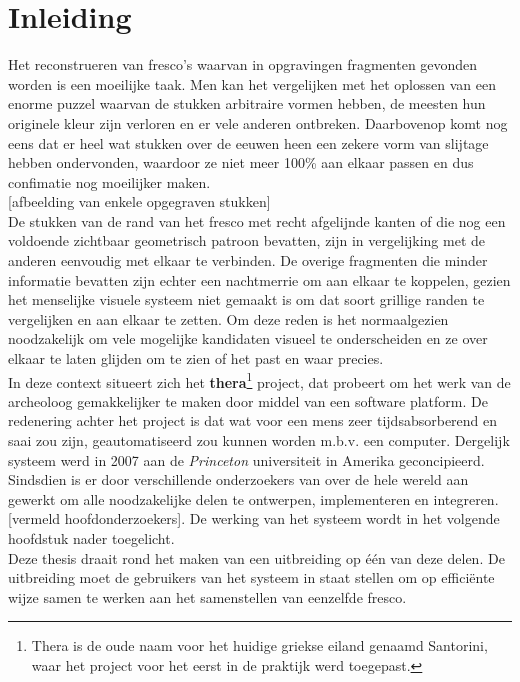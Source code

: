 \chapter{Inleiding}
\label{inleiding}
Het reconstrueren van fresco's waarvan in opgravingen fragmenten gevonden worden is een moeilijke taak. Men kan het vergelijken met het oplossen van een enorme puzzel
waarvan de stukken arbitraire vormen hebben, de meesten hun originele kleur zijn verloren en er vele anderen ontbreken. Daarbovenop komt nog eens dat er
heel wat stukken over de eeuwen heen een zekere vorm van slijtage hebben ondervonden, waardoor ze niet meer 100\% aan elkaar passen en dus confimatie nog moeilijker maken.\\

[afbeelding van enkele opgegraven stukken]\\

De stukken van de rand van het fresco met recht afgelijnde kanten of die nog een voldoende zichtbaar geometrisch patroon bevatten, zijn in vergelijking met de
anderen eenvoudig met elkaar te verbinden. De overige fragmenten die minder informatie bevatten zijn echter een nachtmerrie om aan elkaar te koppelen, gezien het menselijke visuele systeem niet
gemaakt is om dat soort grillige randen te vergelijken en aan elkaar te zetten. Om deze reden is het normaalgezien noodzakelijk om vele mogelijke kandidaten visueel
te onderscheiden en ze over elkaar te laten glijden om te zien of het past en waar precies.\\

In deze context situeert zich het \textbf{thera}\footnote{Thera is de oude naam voor het huidige griekse eiland genaamd Santorini, waar het project voor het eerst in de praktijk werd toegepast.} project, dat probeert om het werk van de archeoloog gemakkelijker te maken door middel van een software platform. De
redenering achter het project is dat wat voor een mens zeer tijdsabsorberend en saai zou zijn, geautomatiseerd zou kunnen worden m.b.v. een computer. Dergelijk systeem werd
in 2007 aan de \emph{Princeton} universiteit in Amerika geconcipieerd. Sindsdien is er door verschillende onderzoekers van over de hele wereld aan gewerkt om
alle noodzakelijke delen te ontwerpen, implementeren en integreren. [vermeld hoofdonderzoekers]. De werking van het systeem wordt in het 
volgende hoofdstuk nader toegelicht.\\

Deze thesis draait rond het maken van een uitbreiding op \'{e}\'{e}n van deze delen. De uitbreiding moet de gebruikers van het systeem in staat stellen om op effici\"{e}nte wijze
samen te werken aan het samenstellen van eenzelfde fresco.\\

